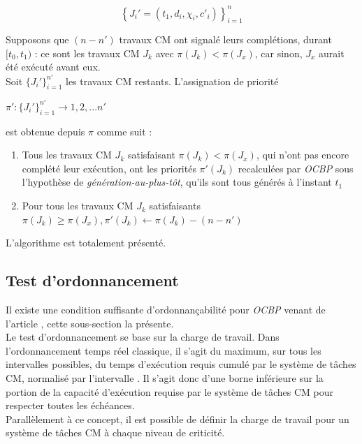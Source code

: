 \documentclass[12pt,a4paper,oneside]{book}
\theoremstyle{break}
\theoremstyle{breakplain}
\begin{document}
\begin{equation}
\left\lbrace J_i' = (t_1, d_i, \chi_i, c'_i) \right\rbrace^n_{i=1}
\end{equation}

Supposons que $(n-n')$ travaux CM ont signalé leurs complétions, durant $[t_0, t_1)$ : ce sont les travaux CM $J_k$ avec $\pi(J_k) < \pi(J_x)$, car sinon, $J_x$ aurait été exécuté avant eux.\\
Soit $\{J_i'\}^{n'}_{i=1}$ les travaux CM restants. L'assignation de priorité

\begin{center}
$\pi' : \{J_i'\}^{n'}_{i=1} \rightarrow {1,2,...n'}$
\end{center}

est obtenue depuis $\pi$ comme suit :

\begin{enumerate}
\item Tous les travaux CM $J_k$ satisfaisant $\pi(J_k) < \pi(J_x)$, qui n'ont pas encore complété leur exécution, ont les priorités $\pi'(J_k)$ recalculées par \textit{OCBP} sous l'hypothèse de \textit{génération-au-plus-tôt}, qu'ils sont tous générés à l'instant $t_1$
\item Pour tous les travaux CM $J_k$ satisfaisants $\pi(J_k) \geq \pi(J_x), \pi'(J_k) \leftarrow \pi(J_k) -(n-n')$
\end{enumerate}

L'algorithme est totalement présenté.

\subsection{Test d'ordonnancement}
Il existe une condition suffisante d'ordonnançabilité pour \textit{OCBP} venant de l'article \cite{guan2011effective}, cette sous-section la présente.\\

Le test d'ordonnancement se base sur la charge de travail. Dans l'ordonnancement temps réel classique, il s'agit du maximum, sur tous les intervalles possibles, du temps d'exécution requis cumulé par le système de tâches CM, normalisé par l'intervalle \cite{guan2011effective}. Il s'agit donc d'une borne inférieure sur la portion de la capacité d'exécution requise par le système de tâches CM pour respecter toutes les échéances.\\

Parallèlement à ce concept, il est possible de définir la charge de travail pour un système de tâches CM à chaque niveau de criticité.\\
\end{document}
